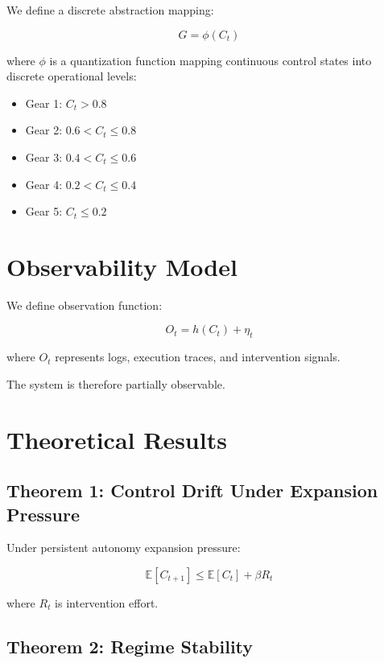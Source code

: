 \documentclass[11pt]{article}
\begin{document}
We define a discrete abstraction mapping:

\begin{equation}
G = \phi(C_t)
\end{equation}

where $\phi$ is a quantization function mapping continuous control states into discrete operational levels:

\begin{itemize}
\item Gear 1: $C_t > 0.8$
\item Gear 2: $0.6 < C_t \leq 0.8$
\item Gear 3: $0.4 < C_t \leq 0.6$
\item Gear 4: $0.2 < C_t \leq 0.4$
\item Gear 5: $C_t \leq 0.2$
\end{itemize}

\section{Observability Model}

We define observation function:

\begin{equation}
O_t = h(C_t) + \eta_t
\end{equation}

where $O_t$ represents logs, execution traces, and intervention signals.

The system is therefore partially observable.

\section{Theoretical Results}

\subsection{Theorem 1: Control Drift Under Expansion Pressure}

Under persistent autonomy expansion pressure:

\begin{equation}
\mathbb{E}[C_{t+1}] \leq \mathbb{E}[C_t] + \beta R_t
\end{equation}

where $R_t$ is intervention effort.

\subsection{Theorem 2: Regime Stability}
\end{document}
